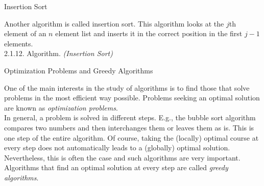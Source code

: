 \documentclass[smaller,hyperref={CJKbookmarks=true}]{beamer}
\newcounter{zhuo}[subsection]
\begin{document}
\begin{frame}[t]{Insertion Sort}
\begin{spacing}{1.05}
Another algorithm is called insertion sort. This algorithm looks at the $j$th
element of an $n$ element list and inserts it in the correct position in the first $j-1$ elements.\\[4pt]
\alert{2.1.12. Algorithm.} \emph{(Insertion Sort)}\\[3pt]
\IncMargin{1em}
\begin{algorithm}[H]
\end{algorithm}\DecMargin{1em}
\end{spacing}
\end{frame}
\begin{frame}[c]{Optimization Problems and Greedy Algorithms}
\begin{spacing}{1.1}
One of the main interests in the study of algorithms is to find those that
solve problems in the most efficient way possible. Problems seeking an
optimal solution are known as \emph{optimization problems}.\\[5pt]
In general, a problem is solved in different steps. E.g., the bubble sort
algorithm compares two numbers and then interchanges them or leaves
them as is. This is one step of the entire algorithm. Of course, taking the
(locally) optimal course at every step does not automatically leads to a
(globally) optimal solution.\\[5pt]
Nevertheless, this is often the case and such algorithms are very
important. Algorithms that find an optimal solution at every step are
called \emph{greedy algorithms}.
\end{spacing}
\end{frame}
\end{document}
